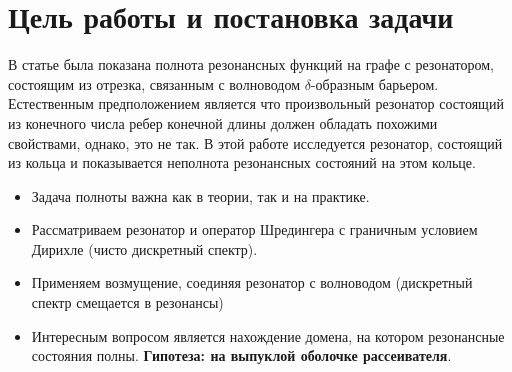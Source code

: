 \startprefacepage




\section{Цель работы и постановка задачи}
В статье \cite{popov_exner70} была показана полнота резонансных функций на графе с резонатором, состоящим из отрезка, связанным с волноводом $\delta$-образным барьером. Естественным предположением является что произвольный резонатор состоящий из конечного числа ребер конечной длины должен обладать похожими свойствами, однако, это не так. В этой работе исследуется резонатор, состоящий из кольца и показывается неполнота резонансных состояний на этом кольце.


\begin{itemize}
\item Задача полноты важна как в теории, так и на практике.

\item Рассматриваем резонатор и оператор Шредингера с граничным условием Дирихле (чисто дискретный спектр).

\item Применяем возмущение, соединяя резонатор с волноводом (дискретный спектр смещается в резонансы)

\item Интересным вопросом является нахождение домена, на котором резонансные состояния полны. \textbf{Гипотеза: на выпуклой оболочке рассеивателя}.
\end{itemize}



